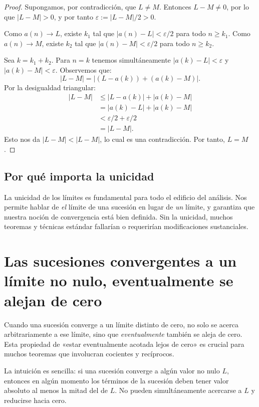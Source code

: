 \begin{proof}
Supongamos, por contradicción, que $L \neq M$. Entonces $L - M \neq 0$, por
lo que $|L - M| > 0$, y por tanto $\varepsilon := |L - M|/2 > 0$.

Como $a(n) \to L$, existe $k_1$ tal que $|a(n) - L| < \varepsilon/2$ para todo
$n \geq k_1$. Como $a(n) \to M$, existe $k_2$ tal que $|a(n) - M| <
\varepsilon/2$ para todo $n \geq k_2$.

Sea $k = k_1 + k_2$. Para $n = k$ tenemos simultáneamente $|a(k) - L| <
\varepsilon$ y $|a(k) - M| < \varepsilon$. Observemos que:
\[
  |L - M| = |(L - a(k)) + (a(k) - M)|.
\]
Por la desigualdad triangular:
\begin{align*}
  |L - M| &\leq |L - a(k)| + |a(k) - M| \\
          &= |a(k) - L| + |a(k) - M| \\
          &< \varepsilon/2 + \varepsilon/2               \\
          &= |L - M|.
\end{align*}
Esto nos da $|L - M| < |L - M|$, lo cual es una contradicción. Por tanto,
$L = M$.
\end{proof}

\subsection{Por qué importa la unicidad}

La unicidad de los límites es fundamental para todo el edificio del análisis.
Nos permite hablar de \emph{el} límite de una sucesión en lugar de \emph{un}
límite, y garantiza que nuestra noción de convergencia está bien definida. Sin
la unicidad, muchos teoremas y técnicas estándar fallarían o requerirían
modificaciones sustanciales.

\section{Las sucesiones convergentes a un límite no nulo, eventualmente se alejan de cero}

Cuando una sucesión converge a un límite distinto de cero, no solo se acerca
arbitrariamente a ese límite, sino que \emph{eventualmente} también se aleja
de cero. Esta propiedad de «estar eventualmente acotada lejos de cero» es
crucial para muchos teoremas que involucran cocientes y recíprocos.

La intuición es sencilla: si una sucesión converge a algún valor no nulo $L$,
entonces en algún momento los términos de la sucesión deben tener valor
absoluto al menos la mitad del de $L$. No pueden simultáneamente acercarse a
$L$ y reducirse hacia cero.


